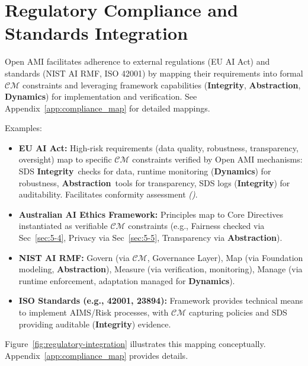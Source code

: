 \documentclass[12pt,a4paper]{report}
\renewcommand{\citep}[1]{\textit{\scriptsize{(\cite{#1})}}}
\newcommand{\Integrity}{\textbf{Integrity}}
\newcommand{\Abstraction}{\textbf{Abstraction}}
\newcommand{\Dynamics}{\textbf{Dynamics}}
\begin{document}
	\section{Regulatory Compliance and Standards Integration} %
	\label{sec:5-3} %
	
	Open AMI facilitates adherence to external regulations (EU AI Act) and standards (NIST AI RMF, ISO 42001) by mapping their requirements into formal $\mathcal{CM}$ constraints and leveraging framework capabilities (\Integrity, \Abstraction, \Dynamics) for implementation and verification. See Appendix~\ref{app:compliance_map} for detailed mappings.
	
	Examples:
	\begin{itemize}
		\item \textbf{EU AI Act:} High-risk requirements (data quality, robustness, transparency, oversight) map to specific $\mathcal{CM}$ constraints verified by Open AMI mechanisms: SDS \Integrity\ checks for data, runtime monitoring (\Dynamics) for robustness, \Abstraction\ tools for transparency, SDS logs (\Integrity) for auditability. Facilitates conformity assessment \citep{Navigating_AI_Conformity_2025}.
		\item \textbf{Australian AI Ethics Framework:} Principles map to Core Directives instantiated as verifiable $\mathcal{CM}$ constraints (e.g., Fairness checked via Sec~\ref{sec:5-4}, Privacy via Sec~\ref{sec:5-5}, Transparency via \Abstraction).
		\item \textbf{NIST AI RMF:} Govern (via $\mathcal{CM}$, Governance Layer), Map (via Foundation modeling, \Abstraction), Measure (via verification, monitoring), Manage (via runtime enforcement, adaptation managed for \Dynamics).
		\item \textbf{ISO Standards (e.g., 42001, 23894):} Framework provides technical means to implement AIMS/Risk processes, with $\mathcal{CM}$ capturing policies and SDS providing auditable (\Integrity) evidence.
	\end{itemize}
	Figure~\ref{fig:regulatory-integration} illustrates this mapping conceptually. Appendix~\ref{app:compliance_map} provides details.
	
\end{document}
